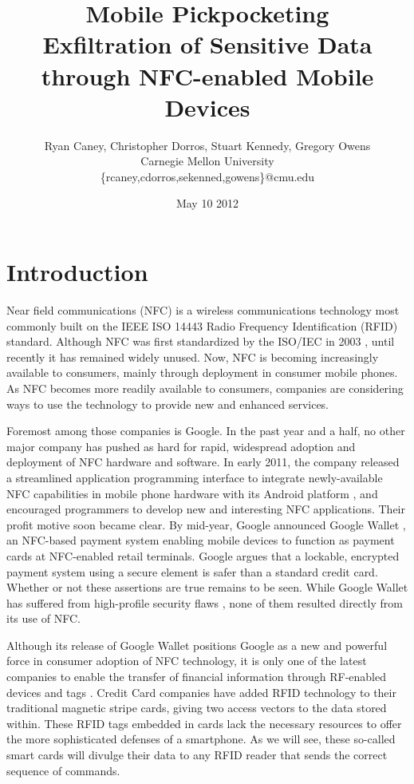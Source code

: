 \documentclass{IEEEtran}
\title{Mobile Pickpocketing \\ \normalsize{Exfiltration of Sensitive Data through NFC-enabled Mobile Devices}}
\author{Ryan Caney, Christopher Dorros, Stuart Kennedy, Gregory Owens \\ Carnegie Mellon University \\ \{rcaney,cdorros,sekenned,gowens\}@cmu.edu}
\date{May 10 2012}
\begin{document}
\begin{onehalfspace}
\maketitle
\end{onehalfspace} 


\section{Introduction}
Near field communications (NFC) is a wireless communications technology most commonly built on the IEEE ISO 14443 Radio Frequency Identification (RFID) standard.  Although NFC was first standardized by the ISO/IEC in 2003 \cite{ecma-nfc-adoption}, until recently it has remained widely unused.  Now, NFC is becoming increasingly available to consumers, mainly through deployment in consumer mobile phones.  As NFC becomes more readily available to consumers, companies are considering ways to use the technology to provide new and enhanced services.

Foremost among those companies is Google.  In the past year and a half, no other major company has pushed as hard for rapid, widespread adoption and deployment of NFC hardware and software.  In early 2011, the company released a streamlined application programming interface to integrate newly-available NFC capabilities in mobile phone hardware with its Android platform \cite{nfcworld-nfc-additions-android-2.3.3}, and encouraged programmers to develop new and interesting NFC applications.  Their profit motive soon became clear.  By mid-year, Google announced Google Wallet \cite{google-blog-1}, an NFC-based payment system enabling mobile devices to function as payment cards at NFC-enabled retail terminals.  Google argues \cite{google-wallet-security-1} that a lockable, encrypted payment system using a secure element is safer than a standard credit card.  Whether or not these assertions are true remains to be seen.  While Google Wallet has suffered from high-profile security flaws \cite{esecurityplanet-google-wallet-hacked}, none of them resulted directly from its use of NFC.

Although its release of Google Wallet positions Google as a new and powerful force in consumer adoption of NFC technology, it is only one of the latest companies to enable the transfer of financial information through RF-enabled devices and tags \cite{smartcardaliance-more-visa-paywave}.  Credit Card companies have added RFID technology to their traditional magnetic stripe cards, giving two access vectors to the data stored within.  These RFID tags embedded in cards lack the necessary resources to offer the more sophisticated defenses of a smartphone.  As we will see, these so-called smart cards will divulge their data to any RFID reader that sends the correct sequence of commands.    
\end{document}
